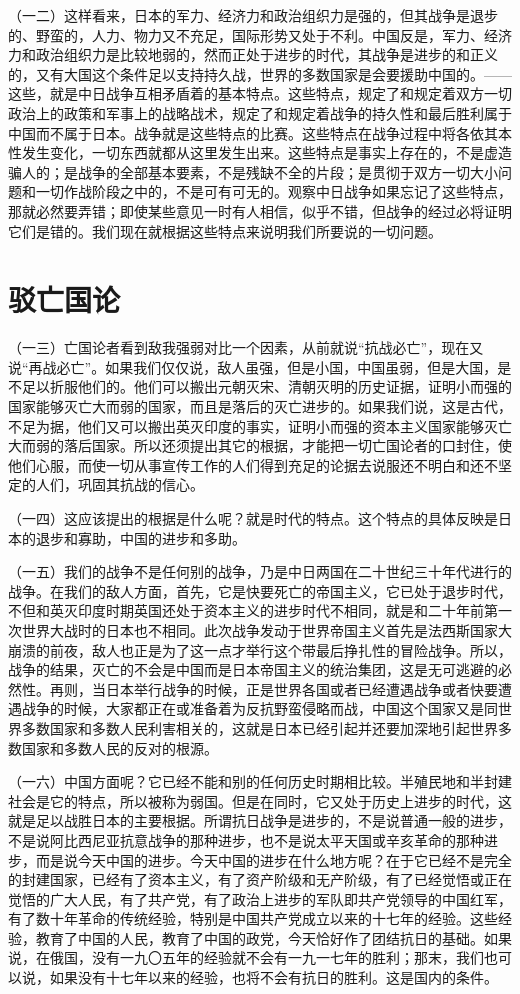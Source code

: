 （一二）这样看来，日本的军力、经济力和政治组织力是强的，但其战争是退步的、野蛮的，人力、物力又不充足，国际形势又处于不利。中国反是，军力、经济力和政治组织力是比较地弱的，然而正处于进步的时代，其战争是进步的和正义的，又有大国这个条件足以支持持久战，世界的多数国家是会要援助中国的。——这些，就是中日战争互相矛盾着的基本特点。这些特点，规定了和规定着双方一切政治上的政策和军事上的战略战术，规定了和规定着战争的持久性和最后胜利属于中国而不属于日本。战争就是这些特点的比赛。这些特点在战争过程中将各依其本性发生变化，一切东西就都从这里发生出来。这些特点是事实上存在的，不是虚造骗人的；是战争的全部基本要素，不是残缺不全的片段；是贯彻于双方一切大小问题和一切作战阶段之中的，不是可有可无的。观察中日战争如果忘记了这些特点，那就必然要弄错；即使某些意见一时有人相信，似乎不错，但战争的经过必将证明它们是错的。我们现在就根据这些特点来说明我们所要说的一切问题。

\section{驳亡国论}

（一三）亡国论者看到敌我强弱对比一个因素，从前就说“抗战必亡”，现在又说“再战必亡”。如果我们仅仅说，敌人虽强，但是小国，中国虽弱，但是大国，是不足以折服他们的。他们可以搬出元朝灭宋、清朝灭明的历史证据，证明小而强的国家能够灭亡大而弱的国家，而且是落后的灭亡进步的。如果我们说，这是古代，不足为据，他们又可以搬出英灭印度的事实，证明小而强的资本主义国家能够灭亡大而弱的落后国家。所以还须提出其它的根据，才能把一切亡国论者的口封住，使他们心服，而使一切从事宣传工作的人们得到充足的论据去说服还不明白和还不坚定的人们，巩固其抗战的信心。

（一四）这应该提出的根据是什么呢？就是时代的特点。这个特点的具体反映是日本的退步和寡助，中国的进步和多助。

（一五）我们的战争不是任何别的战争，乃是中日两国在二十世纪三十年代进行的战争。在我们的敌人方面，首先，它是快要死亡的帝国主义，它已处于退步时代，不但和英灭印度时期英国还处于资本主义的进步时代不相同，就是和二十年前第一次世界大战时的日本也不相同。此次战争发动于世界帝国主义首先是法西斯国家大崩溃的前夜，敌人也正是为了这一点才举行这个带最后挣扎性的冒险战争。所以，战争的结果，灭亡的不会是中国而是日本帝国主义的统治集团，这是无可逃避的必然性。再则，当日本举行战争的时候，正是世界各国或者已经遭遇战争或者快要遭遇战争的时候，大家都正在或准备着为反抗野蛮侵略而战，中国这个国家又是同世界多数国家和多数人民利害相关的，这就是日本已经引起并还要加深地引起世界多数国家和多数人民的反对的根源。

（一六）中国方面呢？它已经不能和别的任何历史时期相比较。半殖民地和半封建社会是它的特点，所以被称为弱国。但是在同时，它又处于历史上进步的时代，这就是足以战胜日本的主要根据。所谓抗日战争是进步的，不是说普通一般的进步，不是说阿比西尼亚抗意战争的那种进步，也不是说太平天国或辛亥革命的那种进步，而是说今天中国的进步。今天中国的进步在什么地方呢？在于它已经不是完全的封建国家，已经有了资本主义，有了资产阶级和无产阶级，有了已经觉悟或正在觉悟的广大人民，有了共产党，有了政治上进步的军队即共产党领导的中国红军，有了数十年革命的传统经验，特别是中国共产党成立以来的十七年的经验。这些经验，教育了中国的人民，教育了中国的政党，今天恰好作了团结抗日的基础。如果说，在俄国，没有一九〇五年的经验就不会有一九一七年的胜利；那末，我们也可以说，如果没有十七年以来的经验，也将不会有抗日的胜利。这是国内的条件。


